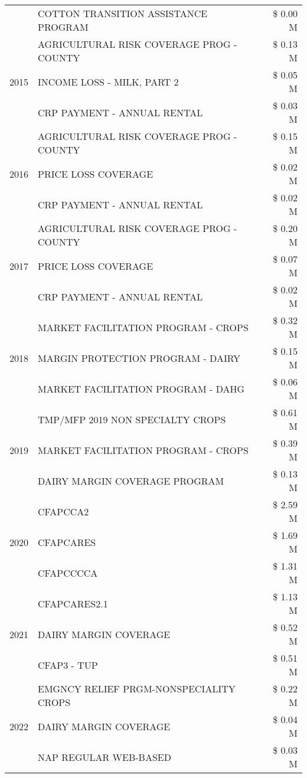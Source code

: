 \begin{tabular}{llr}
 & COTTON TRANSITION ASSISTANCE PROGRAM & \$ 0.00 M \\
\cline{1-3}
\multirow[t]{3}{*}{2015} & AGRICULTURAL RISK COVERAGE PROG - COUNTY & \$ 0.13 M \\
 & INCOME LOSS - MILK, PART 2 & \$ 0.05 M \\
 & CRP PAYMENT - ANNUAL RENTAL & \$ 0.03 M \\
\cline{1-3}
\multirow[t]{3}{*}{2016} & AGRICULTURAL RISK COVERAGE PROG - COUNTY & \$ 0.15 M \\
 & PRICE LOSS COVERAGE & \$ 0.02 M \\
 & CRP PAYMENT - ANNUAL RENTAL & \$ 0.02 M \\
\cline{1-3}
\multirow[t]{3}{*}{2017} & AGRICULTURAL RISK COVERAGE PROG - COUNTY & \$ 0.20 M \\
 & PRICE LOSS COVERAGE & \$ 0.07 M \\
 & CRP PAYMENT - ANNUAL RENTAL & \$ 0.02 M \\
\cline{1-3}
\multirow[t]{3}{*}{2018} & MARKET FACILITATION PROGRAM - CROPS & \$ 0.32 M \\
 & MARGIN PROTECTION PROGRAM - DAIRY & \$ 0.15 M \\
 & MARKET FACILITATION PROGRAM - DAHG & \$ 0.06 M \\
\cline{1-3}
\multirow[t]{3}{*}{2019} & TMP/MFP 2019 NON SPECIALTY CROPS & \$ 0.61 M \\
 & MARKET FACILITATION PROGRAM - CROPS & \$ 0.39 M \\
 & DAIRY MARGIN COVERAGE PROGRAM & \$ 0.13 M \\
\cline{1-3}
\multirow[t]{3}{*}{2020} & CFAPCCA2 & \$ 2.59 M \\
 & CFAPCARES & \$ 1.69 M \\
 & CFAPCCCCA & \$ 1.31 M \\
\cline{1-3}
\multirow[t]{3}{*}{2021} & CFAPCARES2.1 & \$ 1.13 M \\
 & DAIRY MARGIN COVERAGE & \$ 0.52 M \\
 & CFAP3 - TUP & \$ 0.51 M \\
\cline{1-3}
\multirow[t]{3}{*}{2022} & EMGNCY RELIEF PRGM-NONSPECIALITY CROPS & \$ 0.22 M \\
 & DAIRY MARGIN COVERAGE & \$ 0.04 M \\
 & NAP REGULAR WEB-BASED & \$ 0.03 M \\
\cline{1-3}
\bottomrule
\end{tabular}
